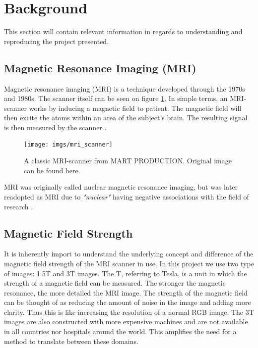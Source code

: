 \documentclass[12pt, fleqn, titlepage]{article}
\newcommand{\1}[1]{\mathds{1}\left[#1\right]}
\begin{document}
\section{Background}

This section will contain relevant information in regards to understanding and reproducing the project presented. 

\subsection{Magnetic Resonance Imaging (MRI)}
Magnetic resonance imaging (MRI) is a technique developed through the 1970s and 1980s. The scanner itself can be seen on figure \ref{fig:mriscanner}. In simple terms, an MRI-scanner works by inducing a magnetic field to patient. The magnetic field will then excite the atoms within an area of the subject's brain. The resulting signal is then measured by the scanner \cite{mri}.  
\begin{figure}[H]
	\centering
	\texttt{[image: imgs/mri\_scanner]}
	\caption{A classic MRI-scanner from MART PRODUCTION. Original image can be found \href{https://www.pexels.com/photo/technology-hospital-medicine-indoors-7089017/}{here}. }
	\label{fig:mriscanner}
\end{figure}

MRI was originally called nuclear magnetic resonance imaging, but was later readopted as MRI due to \textit{"nuclear"} having negative associations with the field of research \cite{wiki} \cite{mri2}.

\subsection{Magnetic Field Strength}
It is inherently import to understand the underlying concept and difference of the magnetic field strength of the MRI scanner in use. In this project we use two type of images: 1.5T and 3T images. The T, referring to Tesla, is a unit in which the strength of a magnetic field can be measured. The stronger the magnetic resonance, the more detailed the MRI image. The strength of the magnetic field can be thought of as reducing the amount of noise in the image and adding more clarity. Thus this is like increasing the resolution of a normal RGB image. The 3T images are also constructed with more expensive machines and are not available in all countries nor hospitals around the world. This amplifies the need for a method to translate between these domains. 
\end{document}

